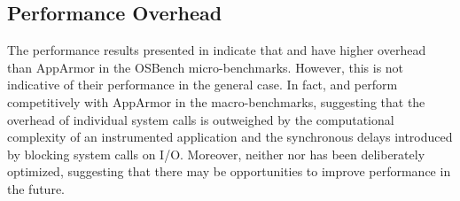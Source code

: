 
\subsection{Performance Overhead}

The performance results presented in  indicate that \bpfbox{} and
\bpfcontain{} have higher overhead than AppArmor in the OSBench micro-benchmarks.
However, this is not indicative of their performance in the general case. In fact,
\bpfbox{} and \bpfcontain{} perform competitively with AppArmor in the macro-benchmarks,
suggesting that the overhead of individual system calls is outweighed by the computational
complexity of an instrumented application and the synchronous delays introduced by
blocking system calls on I/O. Moreover, neither \bpfbox{} nor \bpfcontain{} has been
deliberately optimized, suggesting that there may be opportunities to improve performance
in the future.


